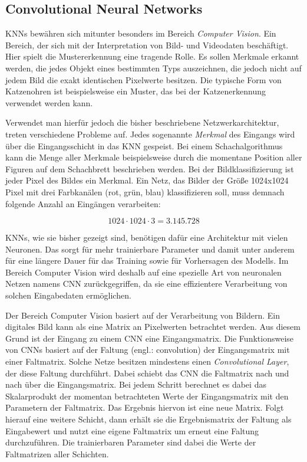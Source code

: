 \subsection{Convolutional Neural Networks}
\acp{KNN} bewähren sich mitunter besonders im Bereich \emph{Computer Vision}. Ein Bereich, der sich mit der Interpretation von Bild- und Videodaten beschäftigt. Hier spielt die Mustererkennung eine tragende Rolle. Es sollen Merkmale erkannt werden, die jedes Objekt eines bestimmten Typs auszeichnen, die jedoch nicht auf jedem Bild die exakt identischen Pixelwerte besitzen. Die typische Form von Katzenohren ist beispielsweise ein Muster, das bei der Katzenerkennung verwendet werden kann. \cite{knnsKompakt}

Verwendet man hierfür jedoch die bisher beschriebene Netzwerkarchitektur, treten verschiedene Probleme auf. Jedes sogenannte \emph{Merkmal} des Eingangs wird über die Eingangsschicht in das \ac{KNN} gespeist. Bei einem Schachalgorithmus kann die Menge aller Merkmale beispielsweise durch die momentane Position aller Figuren auf dem Schachbrett beschrieben werden. Bei der Bildklassifizierung ist jeder Pixel des Bildes ein Merkmal. Ein Netz, das Bilder der Größe 1024x1024 Pixel mit drei Farbkanälen (rot, grün, blau) klassifizieren soll, muss demnach folgende Anzahl an Eingängen verarbeiten: \cite{knnsKompakt}

\begin{equation}
   1024 \cdot 1024 \cdot 3 = 3.145.728
\end{equation}

\acp{KNN}, wie sie bisher gezeigt sind, benötigen dafür eine Architektur mit vielen Neuronen. Das sorgt für mehr trainierbare Parameter und damit unter anderem für eine längere Dauer für das Training sowie für Vorhersagen des Modells. Im Bereich Computer Vision wird deshalb auf eine spezielle Art von neuronalen Netzen namens \ac{CNN} zurückgegriffen, da sie eine effizientere Verarbeitung von solchen Eingabedaten ermöglichen. \cite{knnsKompakt} 

Der Bereich Computer Vision basiert auf der Verarbeitung von Bildern. Ein digitales Bild kann als eine Matrix an Pixelwerten betrachtet werden. Aus diesem Grund ist der Eingang zu einem \ac{CNN} eine Eingangsmatrix. Die Funktionsweise von \acp{CNN} basiert auf der Faltung (engl.: convolution) der Eingangsmatrix mit einer Faltmatrix. Solche Netze besitzen mindestens einen \emph{Convolutional Layer}, der diese Faltung durchführt. Dabei schiebt das \ac{CNN} die Faltmatrix nach und nach über die Eingangsmatrix. Bei jedem Schritt berechnet es dabei das Skalarprodukt der momentan betrachteten Werte der Eingangsmatrix mit den Parametern der Faltmatrix. Das Ergebnis hiervon ist eine neue Matrix. Folgt hierauf eine weitere Schicht, dann erhält sie die Ergebnismatrix der Faltung als Eingabewert und nutzt eine eigene Faltmatrix um erneut eine Faltung durchzuführen. Die trainierbaren Parameter sind dabei die Werte der Faltmatrizen aller Schichten. \cite{DeepLearningBook}

